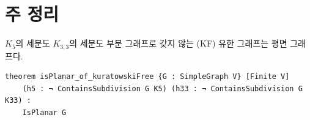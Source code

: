 \chapter{주 정리}
\label{chap:main}

\begin{theorem}
\label{thm:hard}
\leanok
\(K_5\)의 세분도 \(K_{3,3}\)의 세분도 부분 그래프로 갖지 않는 (KF) 유한 그래프는 평면 그래프다.
\begin{verbatim}
theorem isPlanar_of_kuratowskiFree {G : SimpleGraph V} [Finite V]
    (h5 : ¬ ContainsSubdivision G K5) (h33 : ¬ ContainsSubdivision G K33) :
    IsPlanar G
\end{verbatim}
\end{theorem}

